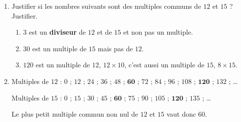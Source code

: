     \begin{enumerate}
        \item Justifier si les nombres suivants sont des multiples communs de $12$ et $15$ ? Justifier.
        \begin{enumerate}
            \item $3$ est un \textbf{diviseur} de $12$ et de $15$ et non pas un multiple.
            \item $30$ est un multiple de $15$ mais pas de $12$.
            \item $120$ est un multiple de $12$, $12\times 10$, c'est aussi un multiple de $15$, $8\times 15$.
        \end{enumerate}
        \item Multiples de $12$ : \sout{$0$} ; $12$ ; $24$ ; $36$ ; $48$ ; $\mathbf{60}$ ; $72$ ; $84$ ; $96$ ; $108$ ; $\mathbf{120}$ ; $132$ ; \dots

        Multiples de $15$ : \sout{$0$} ; $15$ ; $30$ ; $45$ ; $\mathbf{60}$ ; $75$ ; $90$ ; $105$ ; $\mathbf{120}$ ; $135$ ; \dots

        Le plus petit multiple commun non nul de $12$ et $15$ vaut donc $60$.
    \end{enumerate}
